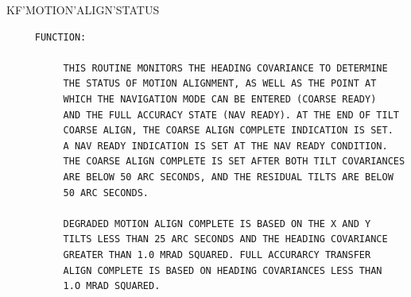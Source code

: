\begin{frame}
KF'MOTION'ALIGN'STATUS
\begin{verbatim}
     FUNCTION:

          THIS ROUTINE MONITORS THE HEADING COVARIANCE TO DETERMINE
          THE STATUS OF MOTION ALIGNMENT, AS WELL AS THE POINT AT
          WHICH THE NAVIGATION MODE CAN BE ENTERED (COARSE READY)
          AND THE FULL ACCURACY STATE (NAV READY). AT THE END OF TILT
          COARSE ALIGN, THE COARSE ALIGN COMPLETE INDICATION IS SET.
          A NAV READY INDICATION IS SET AT THE NAV READY CONDITION.
          THE COARSE ALIGN COMPLETE IS SET AFTER BOTH TILT COVARIANCES
          ARE BELOW 50 ARC SECONDS, AND THE RESIDUAL TILTS ARE BELOW
          50 ARC SECONDS.

          DEGRADED MOTION ALIGN COMPLETE IS BASED ON THE X AND Y
          TILTS LESS THAN 25 ARC SECONDS AND THE HEADING COVARIANCE
          GREATER THAN 1.0 MRAD SQUARED. FULL ACCURARCY TRANSFER
          ALIGN COMPLETE IS BASED ON HEADING COVARIANCES LESS THAN
          1.O MRAD SQUARED.



\end{verbatim}
\end{frame}
